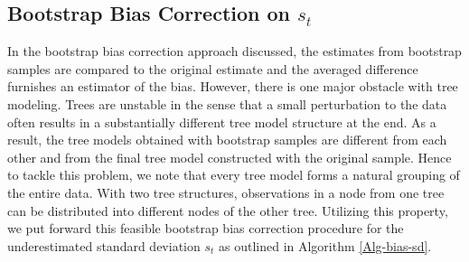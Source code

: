 
\subsection{Bootstrap Bias Correction on $s_t$}

In the bootstrap bias correction approach discussed, the estimates from bootstrap samples are compared to the original estimate and the averaged difference furnishes an estimator of the bias. However, there is one major obstacle with tree modeling. Trees are unstable in the sense that a small perturbation to the data often results in a substantially different tree model structure at the end. As a result, the tree models obtained with bootstrap samples are different from each other and from the final tree model constructed with the original sample. Hence to tackle this problem, we note that every tree model forms a natural grouping of the entire data. With two tree structures, observations in a node from one tree can be distributed into different nodes of the other tree. Utilizing this property, we put forward this feasible bootstrap bias correction procedure for the underestimated standard deviation $s_t$ as outlined in Algorithm \ref{Alg-bias-sd}. 

